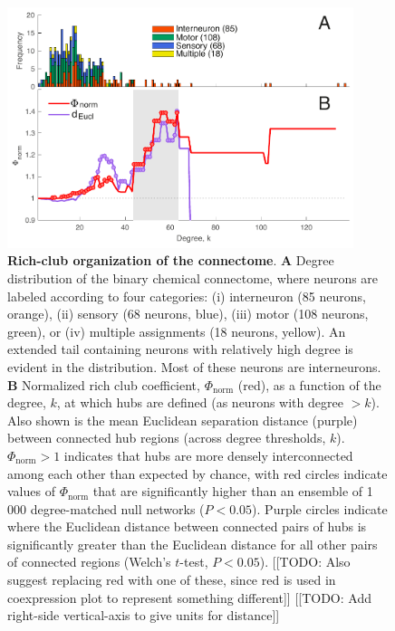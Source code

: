 \documentclass[10pt,letterpaper]{article}
\begin{document}
\begin{figure}[h]
   \centering
    \includegraphics[width=0.9\textwidth]{topologicalRCall.pdf}
 \caption{\textbf{Rich-club organization of the connectome}.
\textbf{A} Degree distribution of the binary chemical connectome, where neurons are labeled according to four categories:
(i) interneuron (85 neurons, orange),
(ii) sensory (68 neurons, blue),
(iii) motor (108 neurons, green), or
(iv) multiple assignments (18 neurons, yellow).
An extended tail containing neurons with relatively high degree is evident in the distribution.
Most of these neurons are interneurons.
\textbf{B}
Normalized rich club coefficient, $\Phi_\mathrm{norm}$ (red), as a function of the degree, $k$, at which hubs are defined (as neurons with degree $>k$).
Also shown is the mean Euclidean separation distance (purple) between connected hub regions (across degree thresholds, $k$).
$\Phi_\mathrm{norm} > 1$ indicates that hubs are more densely interconnected among each other than expected by chance, with red circles indicate values of $\Phi_\mathrm{norm}$ that are significantly higher than an ensemble of 1\,000 degree-matched null networks ($P < 0.05$).
Purple circles indicate where the Euclidean distance between connected pairs of hubs is significantly greater than the Euclidean distance for all other pairs of connected regions (Welch's $t$-test, $P < 0.05$).
[[TODO: Also suggest replacing red with one of these, since red is used in coexpression plot to represent something different]]
[[TODO: Add right-side vertical-axis to give units for distance]]
}
 \label{fig:topology_rich}
 \end{figure}
\end{document}
